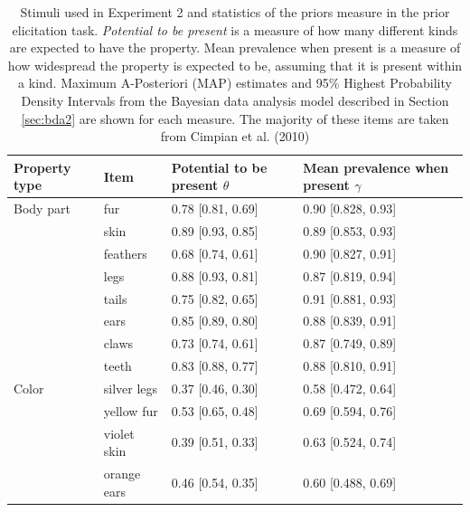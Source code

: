 \documentclass[12pt,letterpaper]{article}
\begin{document}
\begin{table}[h]
\centering
\caption{Stimuli used in Experiment 2 and statistics of the priors measure in the prior elicitation task. 
\emph{Potential to be present} is a measure of how many different kinds are expected to have the property. Mean prevalence when present is a measure of how widespread the property is expected to be, assuming that it is present within a kind.
Maximum A-Posteriori (MAP) estimates and 95\% Highest Probability Density Intervals from the Bayesian data analysis model described in Section \ref{sec:bda2} are shown for each measure.
The majority of these items are taken from Cimpian et al. (2010)}
\label{tab:novelGenericsStimuli}
\begin{tabular}{| l || l | l | l |}
\hline
Property type     & Item               & Potential to be present $\theta$ & Mean prevalence when present $\gamma$ \\
\hline
\hline
Body part         & fur                & 0.78 {[}0.81, 0.69{]}   & 0.90 {[}0.828, 0.93{]}       \\
                  & skin               & 0.89 {[}0.93, 0.85{]}   & 0.89 {[}0.853, 0.93{]}       \\
                  & feathers           & 0.68 {[}0.74, 0.61{]}   & 0.90 {[}0.827, 0.91{]}       \\
                  & legs               & 0.88 {[}0.93, 0.81{]}   & 0.87 {[}0.819, 0.94{]}       \\
                  & tails              & 0.75 {[}0.82, 0.65{]}   & 0.91 {[}0.881, 0.93{]}       \\
                  & ears               & 0.85 {[}0.89, 0.80{]}   & 0.88 {[}0.839, 0.91{]}       \\
                  & claws              & 0.73 {[}0.74, 0.61{]}   & 0.87 {[}0.749, 0.89{]}       \\
                  & teeth              & 0.83 {[}0.88, 0.77{]}   & 0.88 {[}0.810, 0.91{]}       \\
Color             & silver legs        & 0.37 {[}0.46, 0.30{]}   & 0.58 {[}0.472, 0.64{]}       \\
                  & yellow fur         & 0.53 {[}0.65, 0.48{]}   & 0.69 {[}0.594, 0.76{]}       \\
                  & violet skin        & 0.39 {[}0.51, 0.33{]}   & 0.63 {[}0.524, 0.74{]}       \\
                  & orange ears        & 0.46 {[}0.54, 0.35{]}   & 0.60 {[}0.488, 0.69{]}       \\

\end{tabular}
\end{table}
\end{document}
